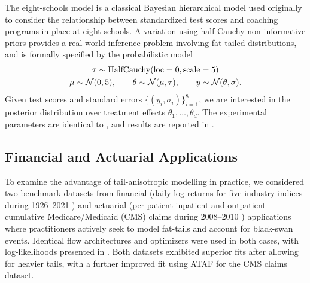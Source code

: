 \documentclass[../../thesis.tex]{subfiles}
\begin{document}
The eight-schools model \citep{rubin1981estimation,gelman2013bayesian} is a classical
Bayesian hierarchical model used originally to consider the relationship between standardized
test scores and coaching programs in place at eight schools.
A variation using half Cauchy non-informative priors \citep{gelman2006prior} provides
a real-world inference problem involving fat-tailed distributions, and is formally specified
by the probabilistic model
\begin{gather*}
  \tau \sim \text{HalfCauchy}(\text{loc}=0, \text{scale}=5)\\
  \mu \sim \mathcal{N}(0, 5),\qquad
  \theta \sim \mathcal{N}(\mu, \tau),\qquad
  y \sim \mathcal{N}(\theta, \sigma) .
\end{gather*}
Given test scores and standard errors $\{(y_i, \sigma_i)\}_{i=1}^8$, we are interested in the
posterior distribution over treatment effects $\theta_1,\ldots,\theta_d$. The experimental
parameters are identical to , and results are reported in .


\subsection{Financial and Actuarial Applications}

To examine the advantage of tail-anisotropic modelling in practice, we considered two benchmark datasets from financial (daily log returns for five industry indices during 1926--2021 \citep{fama2015five}) and actuarial (per-patient inpatient and outpatient cumulative Medicare/Medicaid (CMS) claims during 2008--2010 \citep{cms}) applications where practitioners actively seek to model fat-tails and account for black-swan events. Identical flow architectures and optimizers were used in both cases, with log-likelihoods presented in . Both datasets exhibited superior fits after allowing for heavier tails, with a further improved fit using ATAF for the CMS claims dataset.



\end{document}
